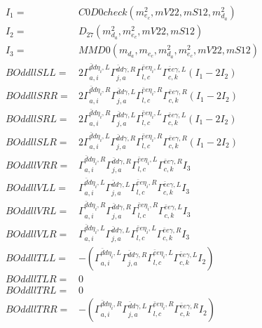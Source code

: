 \documentclass[A4,landscape]{article}
\begin{document}
\begin{align} 
I_1 = & C0D0check(m^2_{e_{{c}}}, mV22, mS12, m^2_{d_{{a}}}) \\ 
I_2 = & D_{27}(m^2_{d_{{a}}}, m^2_{e_{{c}}}, mV22, mS12) \\ 
I_3 = & MMD0(m_{d_{{a}}}, m_{e_{{c}}}, m^2_{d_{{a}}}, m^2_{e_{{c}}}, mV22, mS12) \\ 
  BOddllSLL= & 2  \Gamma^{\bar{d}d \eta_i ,L}_{a, i} \Gamma^{\bar{d}d \gamma ,R}_{j, a} \Gamma^{\bar{e}e \eta_i ,L}_{l, c} \Gamma^{\bar{e}e \gamma ,L}_{c, k} (I_1 - 2 I_2) \\ 
  BOddllSRR= & 2  \Gamma^{\bar{d}d \eta_i ,R}_{a, i} \Gamma^{\bar{d}d \gamma ,L}_{j, a} \Gamma^{\bar{e}e \eta_i ,R}_{l, c} \Gamma^{\bar{e}e \gamma ,R}_{c, k} (I_1 - 2 I_2) \\ 
  BOddllSRL= & 2  \Gamma^{\bar{d}d \eta_i ,R}_{a, i} \Gamma^{\bar{d}d \gamma ,L}_{j, a} \Gamma^{\bar{e}e \eta_i ,L}_{l, c} \Gamma^{\bar{e}e \gamma ,L}_{c, k} (I_1 - 2 I_2) \\ 
  BOddllSLR= & 2  \Gamma^{\bar{d}d \eta_i ,L}_{a, i} \Gamma^{\bar{d}d \gamma ,R}_{j, a} \Gamma^{\bar{e}e \eta_i ,R}_{l, c} \Gamma^{\bar{e}e \gamma ,R}_{c, k} (I_1 - 2 I_2) \\ 
  BOddllVRR= &  \Gamma^{\bar{d}d \eta_i ,R}_{a, i} \Gamma^{\bar{d}d \gamma ,R}_{j, a} \Gamma^{\bar{e}e \eta_i ,L}_{l, c} \Gamma^{\bar{e}e \gamma ,R}_{c, k} I_3 \\ 
  BOddllVLL= &  \Gamma^{\bar{d}d \eta_i ,L}_{a, i} \Gamma^{\bar{d}d \gamma ,L}_{j, a} \Gamma^{\bar{e}e \eta_i ,R}_{l, c} \Gamma^{\bar{e}e \gamma ,L}_{c, k} I_3 \\ 
  BOddllVRL= &  \Gamma^{\bar{d}d \eta_i ,R}_{a, i} \Gamma^{\bar{d}d \gamma ,R}_{j, a} \Gamma^{\bar{e}e \eta_i ,R}_{l, c} \Gamma^{\bar{e}e \gamma ,L}_{c, k} I_3 \\ 
  BOddllVLR= &  \Gamma^{\bar{d}d \eta_i ,L}_{a, i} \Gamma^{\bar{d}d \gamma ,L}_{j, a} \Gamma^{\bar{e}e \eta_i ,L}_{l, c} \Gamma^{\bar{e}e \gamma ,R}_{c, k} I_3 \\ 
  BOddllTLL= & -( \Gamma^{\bar{d}d \eta_i ,L}_{a, i} \Gamma^{\bar{d}d \gamma ,R}_{j, a} \Gamma^{\bar{e}e \eta_i ,L}_{l, c} \Gamma^{\bar{e}e \gamma ,L}_{c, k} I_2) \\ 
  BOddllTLR= & 0 \\ 
  BOddllTRL= & 0 \\ 
  BOddllTRR= & -( \Gamma^{\bar{d}d \eta_i ,R}_{a, i} \Gamma^{\bar{d}d \gamma ,L}_{j, a} \Gamma^{\bar{e}e \eta_i ,R}_{l, c} \Gamma^{\bar{e}e \gamma ,R}_{c, k} I_2) \\ 
\end{align} 
\end{document}
